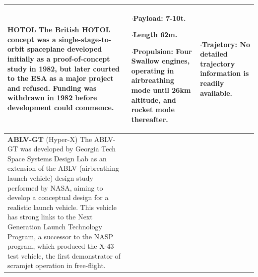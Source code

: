 {\begin{landscape}
\begin{xltabular}{\linewidth}{|X|X|X|}
 \\ 
 \hline \small \textbf{HOTOL}\cite{Aberleen}\newline\newline
 The British HOTOL concept was a single-stage-to-orbit spaceplane developed initially as a proof-of-concept study in 1982, but later courted to the ESA as a major project and refused. Funding was withdrawn in 1982 before development could commence. 
 & \small
 $\cdot$\textbf{Payload:} 7-10t.
 
 $\cdot$\textbf{Length} 62m.
 
 $\cdot$\textbf{Propulsion:} Four Swallow engines, operating in airbreathing mode until 26km altitude, and rocket mode thereafter.
 & \small
 $\cdot$\textbf{Trajetory:} No detailed trajectory information is readily available. 
 \\
\hline \small\textbf{ABLV-GT} (Hyper-X)\cite{Bradford2000, HyperX} 
\newline \newline 
The ABLV-GT was developed by Georgia Tech Space Systems Design Lab as an extension of the ABLV (airbreathing launch vehicle) design study performed by NASA, aiming to develop a conceptual design for a realistic launch vehicle. This vehicle has strong links to the Next Generation Launch Technology Program, a successor to the NASP program, which produced the X-43 test vehicle, the first demonstrator of scramjet operation in free-flight.
&
\small
{}


\end{xltabular}
\end{landscape}}
